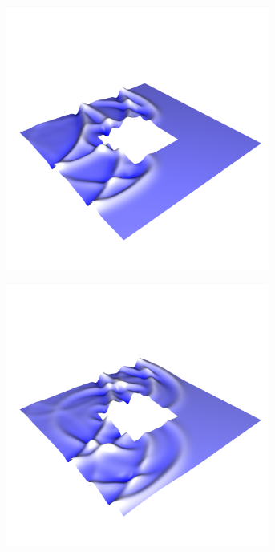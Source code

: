 \documentclass[crop=false,10pt,ngerman]{standalone}
\begin{document}
\begin{figure}[h]
        \begin{subfigure}[b]{0.24\textwidth}
          \center
          \includegraphics[trim={0.9cm 1.8cm 0.5cm 5cm},clip,width=0.95\textwidth]{images/ring_wave_4.png}
          \caption{}
        \end{subfigure}
        \begin{subfigure}[b]{0.24\textwidth}
          \center
          \includegraphics[trim={0.9cm 1.8cm 0.5cm 5cm},clip,width=0.95\textwidth]{images/ring_wave_5.png}

\end{subfigure}
\end{figure}
\end{document}
